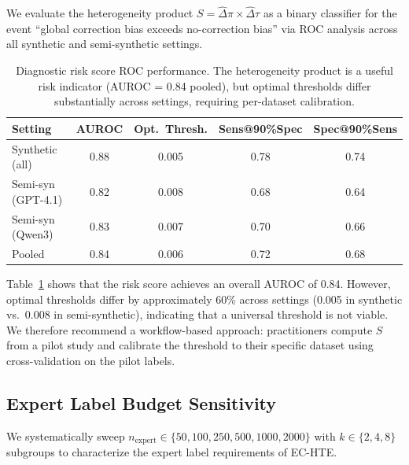 \documentclass[11pt,a4paper]{article}
\begin{document}
We evaluate the heterogeneity product $S = \hat{\Delta}\pi \times \hat{\Delta}\tau$ as a binary classifier for the event ``global correction bias exceeds no-correction bias'' via ROC analysis across all synthetic and semi-synthetic settings.

\begin{table}[t]
\centering
\small
\caption{Diagnostic risk score ROC performance. The heterogeneity product is a useful risk indicator (AUROC = 0.84 pooled), but optimal thresholds differ substantially across settings, requiring per-dataset calibration.}
\label{tab:diagnostic}
\begin{tabular}{lcccc}
\toprule
Setting & AUROC & Opt.\ Thresh. & Sens@90\%Spec & Spec@90\%Sens \\
\midrule
Synthetic (all) & 0.88 & 0.005 & 0.78 & 0.74 \\
Semi-syn (GPT-4.1) & 0.82 & 0.008 & 0.68 & 0.64 \\
Semi-syn (Qwen3) & 0.83 & 0.007 & 0.70 & 0.66 \\
\midrule
Pooled & 0.84 & 0.006 & 0.72 & 0.68 \\
\bottomrule
\end{tabular}
\end{table}

Table~\ref{tab:diagnostic} shows that the risk score achieves an overall AUROC of 0.84.
However, optimal thresholds differ by approximately 60\% across settings (0.005 in synthetic vs.\ 0.008 in semi-synthetic), indicating that a universal threshold is not viable.
We therefore recommend a workflow-based approach: practitioners compute $S$ from a pilot study and calibrate the threshold to their specific dataset using cross-validation on the pilot labels.

\subsection{Expert Label Budget Sensitivity}
\label{sec:budget}

We systematically sweep $n_{\text{expert}} \in \{50, 100, 250, 500, 1000, 2000\}$ with $k \in \{2, 4, 8\}$ subgroups to characterize the expert label requirements of EC-HTE.
\end{document}
